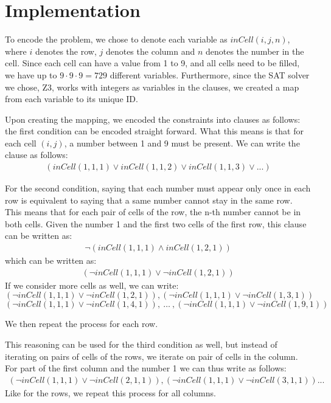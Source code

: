 \documentclass[12pt,a4paper]{article}
\begin{document}
\section*{Implementation}
To encode the problem, we chose to denote each variable as $inCell(i,j,n)$, where $i$ denotes the row, $j$ denotes the column and $n$ denotes the number in the cell.
Since each cell can have a value from 1 to 9, and all cells need to be filled, we have up to $9\cdot9\cdot9 = 729$ different variables.
Furthermore, since the SAT solver we chose, Z3, works with integers as variables in the clauses, we created a map from each variable to its unique ID.

Upon creating the mapping, we encoded the constraints into clauses as follows: the first condition can be encoded straight forward. What this means is that for each cell $(i,j)$, a number between 1 and 9 must be present. We can write the clause as follows:
\begin{align*}
  (inCell(1,1,1) \vee inCell(1,1,2) \vee inCell(1,1,3) \vee ...)
\end{align*}

For the second condition, saying that each number must appear only once in each row is equivalent to saying that a same number cannot stay in the same row. This means that for each pair of cells of the row, the n-th number cannot be in both cells. Given the number 1 and the first two cells of the first row, this clause can be written as:
\begin{align*}
  \neg (inCell(1,1,1) \wedge inCell(1,2,1))
\end{align*}
which can be written as:
\begin{align*}
  (\neg inCell(1,1,1) \vee \neg inCell(1,2,1))
\end{align*}
If we consider more cells as well, we can write:
\[(\neg inCell(1,1,1) \vee \neg inCell(1,2,1)), (\neg inCell(1,1,1) \vee \neg inCell(1,3,1)) \]
\[   (\neg inCell(1,1,1) \vee \neg inCell(1,4,1)),\ \dots \ , (\neg inCell(1,1,1) \vee \neg inCell(1,9,1))\]

We then repeat the process for each row.
\medskip

This reasoning can be used for the third condition as well, but instead of iterating on pairs of cells of the rows, we iterate on pair of cells in the column. For part of the first column and the number 1 we can thus write as follows:
\begin{align*}
  (\neg inCell(1,1,1) \vee \neg inCell(2,1,1)) , (\neg inCell(1,1,1) \vee \neg inCell(3,1,1)) ...
\end{align*}
Like for the rows, we repeat this process for all columns.
\medskip
\end{document}
